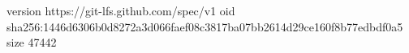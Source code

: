version https://git-lfs.github.com/spec/v1
oid sha256:1446d6306b0d8272a3d066faef08c3817ba07bb2614d29ce160f8b77edbdf0a5
size 47442
